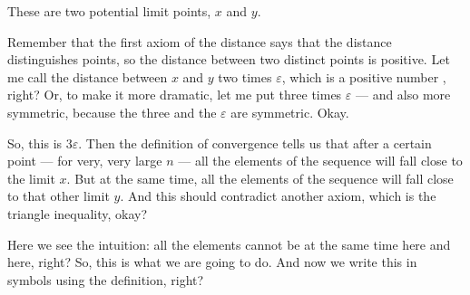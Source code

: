\begin{content}
\end{content}

\begin{proofWrapper}

\begin{speech}[00:09:20 - 00:11:04]
 These are two potential limit points, $x$ and $y$.

Remember that the first axiom of the distance says that the distance distinguishes points, so the distance between two distinct points is positive. Let me call the distance between $x$ and $y$ two times $\varepsilon$, which is a positive number , right? Or, to make it more dramatic, let me put three times $\varepsilon$  --- and also more symmetric, because the three and the $\varepsilon$ are symmetric. Okay.

So, this is $3\varepsilon$. Then the definition of convergence tells us that after a certain point --- for very, very large $n$ --- all the elements of the sequence will fall close to the limit $x$. But at the same time, all the elements of the sequence will fall close to that other limit $y$. And this should contradict another axiom, which is the triangle inequality, okay?

Here we see the intuition: all the elements cannot be at the same time here and here, right? So, this is what we are going to do. And now we write this in symbols using the definition, right? 
\end{speech}


\end{proofWrapper}
